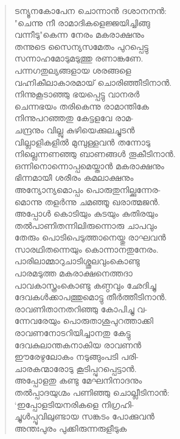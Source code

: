 \begin{verse}
ടന്യൂനകോപേന ചൊന്നാന്‍ ദശാനനന്‍:\\
"ചെന്നു നീ രാമാദികളെജ്ജയിച്ചിങ്ങു\\
വന്നീടു"കെന്ന നേരം മകരാക്ഷനും\\
തന്നുടെ സൈന്യസമേതം പുറപ്പെട്ടു\\
സന്നാഹമോടുമടുത്തു രണാങ്കണേ.\\
പന്നഗതുല്യങ്ങളായ ശരങ്ങളെ\\
വഹ്നികീലാകാരമായ് ചൊരിഞ്ഞീടിനാന്‍.\\
നിന്നുകൂടാഞ്ഞു ഭയപ്പെട്ടു വാനരര്‍\\
ചെന്നഭയം തരികെന്നു രാമാന്തികേ\\
നിന്നുപറഞ്ഞതു കേട്ടളവേ രാമ-\\
ചന്ദ്രനും വില്ലു കുഴിയെക്കുലച്ചുടന്‍\\
വില്ലാളികളില്‍ മുമ്പുള്ളവന്‍ തന്നോടു\\
നില്ലെന്നണഞ്ഞു ബാണങ്ങള്‍ തൂകീടിനാന്‍.\\
ഒന്നിനൊന്നൊപ്പമെയ്താന്‍ മകരാക്ഷനും\\
ഭിന്നമായീ ശരീരം കമലാക്ഷനും\\
അന്യോന്യമൊപ്പം പൊരുതുനില്ക്കുന്നേര-\\
മൊന്നു തളര്‍ന്നു ചമഞ്ഞൂ ഖരാത്മജന്‍.\\
അപ്പോള്‍ കൊടിയും കുടയും കുതിരയും\\
തല്‍പാണിതന്നിലിരുന്നൊരു ചാപവും\\
തേരും പൊടിപെടുത്താനെയ്തു രാഘവന്‍\\
സാരഥിതന്നെയും കൊന്നാനതുനേരം.\\
പാരിലാമ്മാറുചാടിശ്ശൂലവുംകൊണ്ടു\\
പാരമടുത്ത മകരാക്ഷനെത്തദാ\\
പാവകാസ്ത്രംകൊണ്ടു കണ്ഠവും ഛേദിച്ചു\\
ദേവകള്‍ക്കാപത്തുമൊട്ടു തീര്‍ത്തീടിനാന്‍.\\
രാവണിതാനതറിഞ്ഞു കോപിച്ചു വ-\\
ന്നേവരേയും പൊരുതാശുപുറത്താക്കി\\
രാവണനോടറിയിച്ചാനതു കേട്ടു\\
ദേവകുലാന്തകനാകിയ രാവണന്‍\\
ഈരേഴുലോകം നടുങ്ങുംപടി പരി-\\
ചാരകന്മാരോടു കൂടിപ്പുറപ്പെട്ടാന്‍.\\
അപ്പോളതു കണ്ടു മേഘനിനാദനും\\
തല്‍പ്പാദയുഗ്മം പണിഞ്ഞു ചൊല്ലീടിനാന്‍:\\
‘ഇപ്പോളടിയനരികളെ നിഗ്രഹി-\\
ച്ചുള്‍പ്പൂവിലുണ്ടായ സങ്കടം പോക്കുവന്‍\\
അന്തഃപുരം പുക്കിരുന്നരുളീടുക\\

\end{verse}
